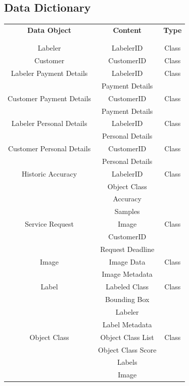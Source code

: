 \documentclass[12pt]{article}
\begin{document}
\subsection{Data Dictionary}
\begin{center}
\begin{tabular}{ |c|c|c| } %
  \hline
    \textbf{Data Object} & \hspace{80pt} \textbf{Content} \hspace{80pt} & \textbf{Type} \\
    & & \\
    & & \\
    \hline
    Labeler &  LabelerID & Class \\ 
    \hline
    Customer &  CustomerID & Class \\ 
    \hline
    Labeler Payment Details &  LabelerID & Class \\ 
    &  Payment Details & \\
    \hline
    Customer Payment Details &  CustomerID & Class \\ 
    &  Payment Details & \\
    \hline
    Labeler Personal Details &  LabelerID & Class \\ 
    &  Personal Details & \\
    \hline
    Customer Personal Details &  CustomerID & Class \\ 
    &  Personal Details & \\
    \hline
    Historic Accuracy &  LabelerID & Class \\ 
    &  Object Class & \\
    &  Accuracy & \\
    &  Samples & \\
    \hline
    Service Request &  Image & Class \\ 
    &  CustomerID & \\
    &  Request Deadline & \\
    \hline
    Image &  Image Data & Class \\ 
    &  Image Metadata & \\
    \hline
    Label &  Labeled Class & Class \\ 
    &  Bounding Box & \\
    &  Labeler & \\
    &  Label Metadata & \\
    \hline
    Object Class &  Object Class List & Class \\ 
    &  Object Class Score & \\
    &  Labels & \\
    &  Image & \\
    \hline
    
    
\end{tabular}
\end{center}
\end{document}
